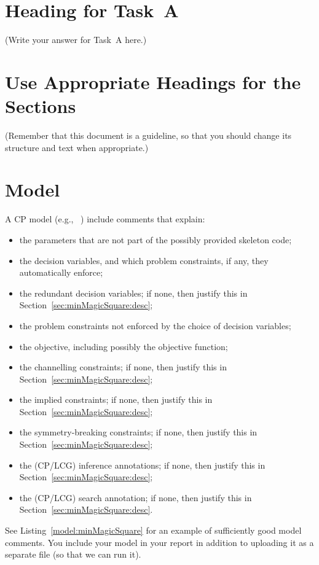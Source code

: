 \documentclass[a4paper,11pt]{article}
\begin{document}
\section{Heading for Task~A}

(Write your answer for Task~A here.)

\section{Use Appropriate Headings for the Sections}

(Remember that this document is a guideline, so that you should change
its structure and text when appropriate.)

\section{Model}
\label{sec:minMagicSquare:model}


A CP model (e.g., \MiniZinc~\cite{MiniZinc})  include comments
that explain:
\begin{itemize}
\item the parameters that are not part of the possibly provided
  skeleton code;
\item the decision variables, and which problem constraints, if any,
  they automatically enforce;
\item the redundant decision variables; if none, then justify this in
  Section~\ref{sec:minMagicSquare:desc};
\item the problem constraints not enforced by the choice of decision
  variables;
\item the objective, including possibly the objective function;
\item the channelling constraints; if none, then justify this in
  Section~\ref{sec:minMagicSquare:desc};
\item the implied constraints; if none, then justify this in
  Section~\ref{sec:minMagicSquare:desc};
\item the symmetry-breaking constraints; if none, then justify this in
  Section~\ref{sec:minMagicSquare:desc};
\item the (CP/LCG) inference annotations; if none, then justify this in
  Section~\ref{sec:minMagicSquare:desc};
\item the (CP/LCG) search annotation; if none, then justify this in
  Section~\ref{sec:minMagicSquare:desc}.
\end{itemize}
%
See Listing~\ref{model:minMagicSquare} for an example of sufficiently
good model comments.
%
You  include your model in your report in addition to
uploading it as a separate file (so that we can run it).
\end{document}
